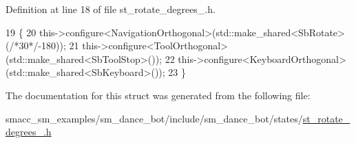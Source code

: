 Definition at line 18 of file st\+\_\+rotate\+\_\+degrees\+\_.\+h.


\begin{DoxyCode}
19   \{
20     this->configure<NavigationOrthogonal>(std::make\_shared<SbRotate>(\textcolor{comment}{/*30*/}-180));
21     this->configure<ToolOrthogonal>(std::make\_shared<SbToolStop>());
22     this->configure<KeyboardOrthogonal>(std::make\_shared<SbKeyboard>());
23   \}
\end{DoxyCode}


The documentation for this struct was generated from the following file\+:\begin{DoxyCompactItemize}
\item 
smacc\+\_\+sm\+\_\+examples/sm\+\_\+dance\+\_\+bot/include/sm\+\_\+dance\+\_\+bot/states/\hyperlink{st__rotate__degrees__6_8h}{st\+\_\+rotate\+\_\+degrees\+\_.\+h}\end{DoxyCompactItemize}
